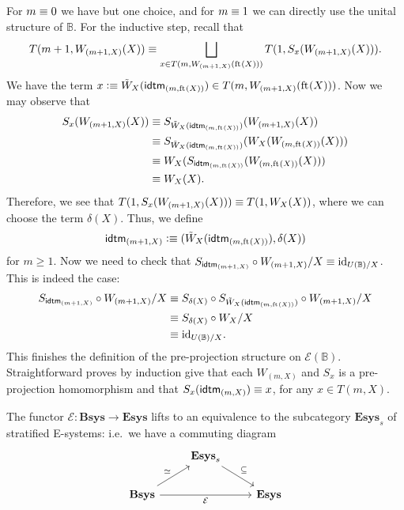 \begin{constr}
For $m\equiv 0$ we have but one
choice, and for $m\equiv 1$ we can directly use the unital structure of
$\mathbb{B}$. For the inductive step, recall that
\begin{equation*}
T(m+1,W_{(m+1,X)}(X))\equiv\bigsqcup_{x\in T(m,W_{(m+1,X)}(\mathrm{ft}_{}(X)))}T(1,S_x(W_{(m+1,X)}(X))).
\end{equation*}
We have the term $x\defeq \tilde{W}_X(\tfid{(m,\eft(X))})\in T(m,W_{(m+1,X)}(\eft(X)))$.
Now we may observe that 
\begin{align*}
S_x(W_{(m+1,X)}(X))
  & \jdeq 
S_{\tilde{W}_X(\tfid{(m,\eft(X))})}(W_{(m+1,X)}(X))\\
  & \jdeq 
S_{\tilde{W}_X(\tfid{(m,\eft(X))})}(W_X(W_{(m,\eft(X))}(X))) \\
  & \jdeq
W_{X}(S_{\tfid{(m,\eft(X))}}(W_{(m,\eft(X))}(X))) \\
  & \jdeq 
W_{X}(X).
\end{align*}
Therefore, we see that $T(1,S_x(W_{(m+1,X)}(X)))\equiv T(1,W_X(X))$, where we can
choose the term $\delta(X)$. Thus, we define
\begin{equation*}
\tfid{(m+1,X)}\defeq (\tilde{W}_X(\tfid{(m,\eft(X))}),\delta(X))
\end{equation*} 
for $m\geq 1$. Now we need to check that $S_{\tfid{(m+1,X)}}\circ 
W_{(m+1,X)}/X\jdeq \catid{U(\mathbb{B})/X}$. This is indeed the case:
\begin{align*}
S_{\tfid{(m+1,X)}}\circ W_{(m+1,X)}/X
  & \jdeq
S_{\delta(X)}\circ S_{\tilde{W}_X(\tfid{(m,\eft(X))})}\circ W_{(m+1,X)}/X \\
  & \jdeq
S_{\delta(X)}\circ W_X/X \\
  & \jdeq
\catid{U(\mathbb{B})/X}.
\end{align*}
This finishes the definition of the pre-projection structure on $\mathcal{E}(\mathbb{B})$.
Straightforward proves by induction give that each $W_{(m,X)}$ and $S_x$ is a 
pre-projection homomorphism and that $S_x(\tfid{(m,X)})\jdeq x$, for any 
$x\in T(m,X)$.
\end{constr}

\begin{thm}
The functor $\mathcal{E}:\mathbf{Bsys}\to\mathbf{Esys}$ lifts to an equivalence
to the subcategory $\mathbf{Esys}_s$ of stratified E-systems: i.e.~we have a
commuting diagram
\begin{equation*}
\begin{tikzcd}
& \mathbf{Esys}_s \arrow[dr,"\subseteq"]\\
\mathbf{Bsys} \arrow[ur,"\simeq"] \arrow[rr,swap,"\mathcal{E}"] & & \mathbf{Esys}
\end{tikzcd}
\end{equation*}
\end{thm}


